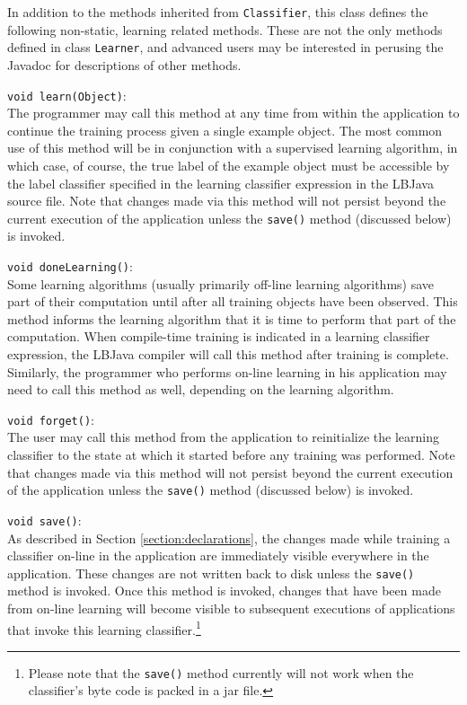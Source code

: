 In addition to the methods inherited from {\tt Classifier}, this class defines
the following non-static, learning related methods.  These are not the only
methods defined in class {\tt Learner}, and advanced users may be interested
in perusing the Javadoc for descriptions of other methods.

\begin{list}{}{}
\item[{\tt void learn(Object)}:] ~\\
The programmer may call this method at any time from within the application to
continue the training process given a single example object.  The most common
use of this method will be in conjunction with a supervised learning
algorithm, in which case, of course, the true label of the example object must
be accessible by the label classifier specified in the learning classifier
expression in the LBJava source file.  Note that changes made via this method
will not persist beyond the current execution of the application unless the
{\tt save()} method (discussed below) is invoked.

\item[{\tt void doneLearning()}:] ~\\
Some learning algorithms (usually primarily off-line learning algorithms) save
part of their computation until after all training objects have been
observed.  This method informs the learning algorithm that it is time to
perform that part of the computation.  When compile-time training is indicated
in a learning classifier expression, the LBJava compiler will call this method
after training is complete.  Similarly, the programmer who performs on-line
learning in his application may need to call this method as well, depending on
the learning algorithm.

\item[{\tt void forget()}:] ~\\
The user may call this method from the application to reinitialize the
learning classifier to the state at which it started before any training was
performed.  Note that changes made via this method will not persist beyond
the current execution of the application unless the {\tt save()} method
(discussed below) is invoked.

\item[{\tt void save()}:] ~\\
As described in Section \ref{section:declarations}, the changes made while
training a classifier on-line in the application are immediately visible
everywhere in the application.  These changes are not written back to disk
unless the {\tt save()} method is invoked.  Once this method is invoked,
changes that have been made from on-line learning will become visible to
subsequent executions of applications that invoke this learning
classifier.\footnote{Please note that the {\tt save()} method currently will
not work when the classifier's byte code is packed in a jar file.}


\end{list}

